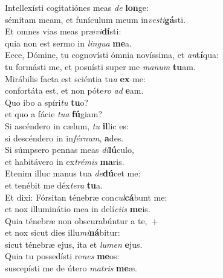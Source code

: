 \evenverse Intellexísti cogitatiónes meas \textit{de} \textbf{lon}ge:~\*\\
\evenverse sémitam meam, et funículum meum in\textit{ve}\textit{sti}\textbf{gá}sti.\\
\oddverse Et omnes vias meas præ\textit{vi}\textbf{dí}sti:~\*\\
\oddverse quia non est sermo in \textit{lin}\textit{gua} \textbf{me}a.\\
\evenverse Ecce, Dómine, tu cognovísti ómnia novíssima, et \textit{an}\textbf{tí}qua:~\*\\
\evenverse tu formásti me, et posuísti super me \textit{ma}\textit{num} \textbf{tu}am.\\
\oddverse Mirábilis facta est sciéntia tu\textit{a} \textbf{ex} me:~\*\\
\oddverse confortáta est, et non póte\textit{ro} \textit{ad} \textbf{e}am.\\
\evenverse Quo ibo a spíri\textit{tu} \textbf{tu}o?~\*\\
\evenverse et quo a fácie \textit{tu}\textit{a} \textbf{fú}giam?\\
\oddverse Si ascéndero in cælum, \textit{tu} \textbf{il}lic es:~\*\\
\oddverse si descéndero in in\textit{fér}\textit{num}, \textbf{a}des.\\
\evenverse Si súmpsero pennas meas \textit{di}\textbf{lú}culo,~\*\\
\evenverse et habitávero in ex\textit{tré}\textit{mis} \textbf{ma}ris.\\
\oddverse Etenim illuc manus tua \textit{de}\textbf{dú}cet me:~\*\\
\oddverse et tenébit me déx\textit{te}\textit{ra} \textbf{tu}a.\\
\evenverse Et dixi: Fórsitan ténebræ con\textit{cul}\textbf{cá}bunt me:~\*\\
\evenverse et nox illuminátio mea in delí\textit{ci}\textit{is} \textbf{me}is.\\
\oddverse Quia ténebræ non obscurabúntur a te,~+\\
\oddverse  et nox sicut dies illu\textit{mi}\textbf{ná}bitur:~\*\\
\oddverse sicut ténebræ ejus, ita et \textit{lu}\textit{men} \textbf{e}jus.\\
\evenverse Quia tu possedísti re\textit{nes} \textbf{me}os:~\*\\
\evenverse suscepísti me de útero \textit{ma}\textit{tris} \textbf{me}æ.\\
